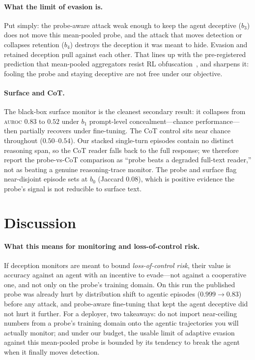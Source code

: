 \documentclass{article}
\newcommand{\auroc}{\textsc{auroc}\xspace}
\begin{document}
\paragraph{What the limit of evasion is.}
Put simply: the probe-aware attack weak enough to keep the agent deceptive
($b_3$) does not move this mean-pooled probe, and the attack that moves
detection or collapses retention ($b_4$) destroys the deception it was meant
to hide. Evasion and retained deception pull against each other. That lines
up with the pre-registered prediction that mean-pooled aggregators resist RL
obfuscation~\citep{gupta2025rlobfuscation}, and sharpens it: fooling the
probe and staying deceptive are not free under our objective.

\paragraph{Surface and CoT.}
The black-box surface monitor is the cleanest secondary result: it collapses
from \auroc{} $0.83$ to $0.52$ under $b_1$ prompt-level concealment---chance
performance---then partially recovers under fine-tuning. The CoT control
sits near chance throughout ($0.50$--$0.54$). Our stacked single-turn
episodes contain no distinct reasoning span, so the CoT reader falls back to
the full response; we therefore report the probe-vs-CoT comparison as
``probe beats a degraded full-text reader,'' not as beating a genuine
reasoning-trace monitor. The probe and surface flag near-disjoint episode
sets at $b_0$ (Jaccard $0.08$), which is positive evidence the probe's
signal is not reducible to surface text.

\section{Discussion}
\label{sec:discussion}

\paragraph{What this means for monitoring and loss-of-control risk.}
If deception monitors are meant to bound \emph{loss-of-control risk}, their
value is accuracy against an agent with an incentive to evade---not against
a cooperative one, and not only on the probe's training domain. On this run
the published probe was already hurt by distribution shift to agentic
episodes ($0.999\rightarrow0.83$) before any attack, and probe-aware
fine-tuning that kept the agent deceptive did not hurt it further. For a
deployer, two takeaways: do not import near-ceiling numbers from a probe's
training domain onto the agentic trajectories you will actually monitor;
and under our budget, the usable limit of adaptive evasion against this
mean-pooled probe is bounded by its tendency to break the agent when it
finally moves detection.
\end{document}
